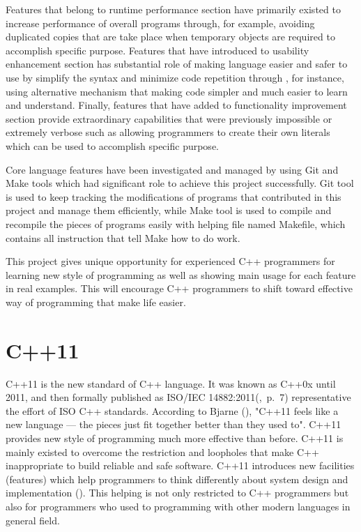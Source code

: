 \documentclass[11pt]{report}
\begin{document}
Features that belong to runtime performance section have primarily existed to increase performance of overall programs through, for example, avoiding duplicated copies that are take place when temporary objects are required to accomplish specific purpose.  Features that have introduced to usability enhancement section has substantial role of making language easier and safer to use by simplify the syntax and minimize code repetition through , for instance, using alternative mechanism that making code simpler and  much easier to learn and understand.  Finally, features that have added to functionality improvement section provide extraordinary capabilities that were previously impossible or extremely verbose such as allowing programmers to create their own literals which can be used to accomplish specific purpose. 

Core language features have been investigated and managed by using Git and Make tools which had significant role to achieve this project successfully. Git tool is used to keep tracking the modifications of programs that contributed in this project and manage them efficiently, while Make tool is used to compile and recompile the pieces of programs easily with helping file named Makefile, which contains all instruction that tell Make how to do work. 

This project gives unique opportunity for experienced C++ programmers for learning new style of programming as well as showing main usage for each feature in real examples. This will encourage C++ programmers to shift toward effective way of programming that make life easier.

\section{C++11}
\label{sec: C++11}
C++11 is the new standard of C++ language. It was known as C++0x until 2011, and then formally published as ISO/IEC 14882:2011(\cite{Josuttis:2012:CppStandard},~p.~7) representative the effort of ISO C++ standards.  According to Bjarne (\cite{Stroustrup:2012:Cpp11}), "C++11 feels like a new language — the pieces just fit together better than they used to". C++11 provides new style of programming much more effective than before. C++11 is mainly existed to overcome the restriction and loopholes that make C++ inappropriate to build reliable and safe software.  C++11 introduces new facilities (features) which help programmers to think differently about system design and implementation (\cite{Stroustrup:2012:Cpp11}). This helping is not only restricted to C++ programmers but also for programmers who used to programming with other modern languages in general field. 
\end{document}

